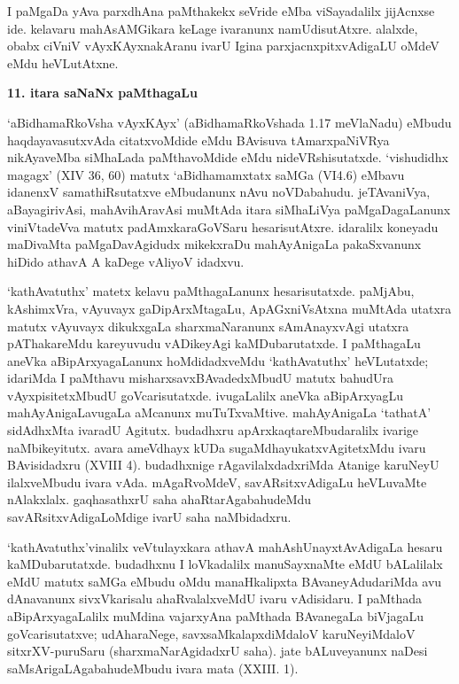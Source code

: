 I paMgaDa yAva parxdhAna paMthakekx seVride eMba viSayadalilx jijAcnxse ide. kelavaru mahAsAMGikara keLage ivaranunx namUdisutAtxre. alalxde, obabx ciVniV vAyxKAyxnakAranu ivarU Igina parxjacnxpitxvAdigaLU oMdeV eMdu heVLutAtxne.

\begin{center}
{\textbf{\Large 11. itara saNaNx paMthagaLu}}
\end{center}
 
`aBidhamaRkoVsha vAyxKAyx' (aBidhamaRkoVshada 1.17 meVlaNadu) eMbudu haqdayavasutxvAda citatxvoMdide eMdu BAvisuva tAmarxpaNiVRya nikAyaveMba siMhaLada paMthavoMdide eMdu nideVRshisutatxde. `vishudidhx magagx' {\rm (XIV 36, 60)} matutx `aBidhamamxtatx saMGa {\rm (VI4.6)} eMbavu idanenxV samathiRsutatxve eMbudanunx nAvu noVDabahudu. jeTAvaniVya, aBayagirivAsi, mahAvihAravAsi muMtAda itara siMhaLiVya paMgaDagaLanunx viniVtadeVva matutx padAmxkaraGoVSaru hesarisutAtxre. idaralilx koneyadu maDivaMta paMgaDavAgidudx mikekxraDu mahAyAnigaLa pakaSxvanunx hiDido athavA A kaDege vAliyoV idadxvu.

`kathAvatuthx' matetx kelavu paMthagaLanunx hesarisutatxde. paMjAbu, kAshimxVra, vAyuvayx gaDipArxMtagaLu, ApAGxniVsAtxna muMtAda utatxra matutx vAyuvayx dikukxgaLa sharxmaNaranunx sAmAnayxvAgi utatxra pAThakareMdu kareyuvudu vADikeyAgi kaMDubarutatxde. I paMthagaLu aneVka aBipArxyagaLanunx hoMdidadxveMdu `kathAvatuthx' heVLutatxde; idariMda I paMthavu misharxsavxBAvadedxMbudU matutx bahudUra vAyxpisitetxMbudU goVcarisutatxde. ivugaLalilx aneVka aBipArxyagLu mahAyAnigaLavugaLa aMcanunx muTuTxvaMtive. mahAyAnigaLa `tathatA' sidAdhxMta ivaradU Agitutx. budadhxru apArxkaqtareMbudaralilx ivarige naMbikeyitutx. avara ameVdhayx kUDa sugaMdhayukatxvAgitetxMdu ivaru BAvisidadxru {\rm (XVIII 4)}. budadhxnige rAgavilalxdadxriMda Atanige karuNeyU ilalxveMbudu ivara vAda. mAgaRvoMdeV, savARsitxvAdigaLu heVLuvaMte nAlakxlalx. gaqhasathxrU saha ahaRtarAgabahudeMdu savARsitxvAdigaLoMdige ivarU saha naMbidadxru.

`kathAvatuthx'vinalilx veVtulayxkara athavA mahAshUnayxtAvAdigaLa hesaru kaMDu\-barutatxde. budadhxnu  I loVkadalilx manuSayxnaMte eMdU bALalilalx eMdU matutx saMGa eMbudu oMdu manaHkalipxta BAvaneyAdudariMda avu dAnavanunx sivxVkarisalu ahaRvalalxveMdU ivaru vAdisidaru. I paMthada aBipArxyagaLalilx muMdina vajarxyAna paMthada BAvanegaLa biVjagaLu goVcarisutatxve; udAharaNege, savxsaMkalapxdiMdaloV karuNeyiMdaloV sitxrXV-puruSaru (sharxmaNarAgidadxrU saha). jate bALuveyanunx naDesi saMsArigaLAgabahudeMbudu ivara mata {\rm (XXIII. 1)}.

